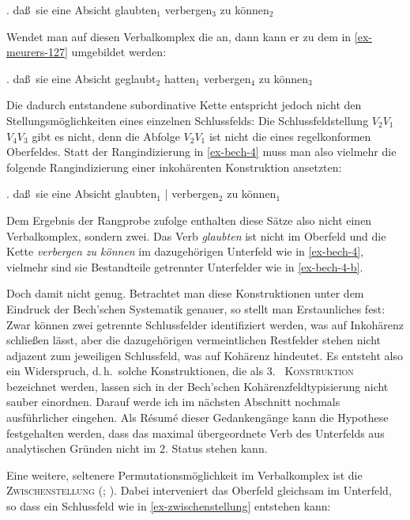 \ex. \label{ex-bech-4} da\ss\ sie eine Absicht glaubten$_1$ verbergen$_3$ zu können$_2$ \hfill \citep[\S 62]{Bech:55} 

Wendet man auf diesen Verbalkomplex die  an, dann kann er zu dem in \ref{ex-meurers-127} umgebildet werden:

\ex. da\ss\ sie eine Absicht geglaubt$_2$ hatten$_1$ verbergen$_4$ zu können$_3$ \\ \citep[(127)]{Meurers:99}\label{ex-meurers-127}

Die dadurch entstandene subordinative Kette entspricht jedoch nicht den Stellungsmöglichkeiten eines einzelnen Schlussfelds: Die Schlussfeldstellung $V_2 V_1$ $V_4 V_3$ gibt es nicht, denn die Abfolge $V_2 V_1$ ist nicht die eines regelkonformen Oberfeldes. Statt der Rangindizierung in \ref{ex-bech-4} muss man also vielmehr die folgende Rangindizierung einer inkohärenten Konstruktion ansetzten:

\ex. \label{ex-bech-4-b}da\ss\ sie eine Absicht glaubten$_1$ | verbergen$_2$ zu können$_1$
 
Dem Ergebnis der Rangprobe zufolge enthalten diese Sätze also nicht einen Verbalkomplex, sondern zwei. Das Verb {\it glaubten} ist nicht im Oberfeld und die Kette {\it verbergen zu können} im dazugehörigen Unterfeld wie in \ref{ex-bech-4}, vielmehr sind sie Bestandteile getrennter Unterfelder wie in \ref{ex-bech-4-b}.

Doch damit nicht genug. Betrachtet man diese Konstruktionen unter dem Eindruck der Bech'schen Systematik genauer, so stellt man Erstaunliches fest: Zwar können zwei getrennte Schlussfelder identifiziert werden, was auf Inkohärenz schlie\ss en lässt, aber die dazugehörigen vermeintlichen Restfelder stehen nicht adjazent zum jeweiligen Schlussfeld, was auf Kohärenz hindeutet. Es entsteht also ein Widerspruch, d.\,h.\ solche Konstruktionen, die als \textsc{3.~ Konstruktion} \citep{denBesten:Rutten:89} bezeichnet werden, lassen sich in der Bech'schen Kohärenzfeldtypisierung nicht sauber einordnen. Darauf werde ich im nächsten Abschnitt nochmals ausführlicher eingehen. Als R\'esum\'e dieser Gedankengänge kann die Hypothese festgehalten werden, dass das maximal übergeordnete Verb des Unterfelds aus analytischen Gründen nicht im 2. Status stehen kann. %
 
Eine weitere, seltenere Permutationsmöglichkeit im Verbalkomplex ist die \linebreak \textsc{Zwischenstellung}  (\citealt{Meurers:94}; \citealt[84ff]{Meurers:99}). Dabei interveniert das Oberfeld gleichsam im Unterfeld, so dass ein Schlussfeld wie in \ref{ex-zwischenstellung} entstehen kann: 

